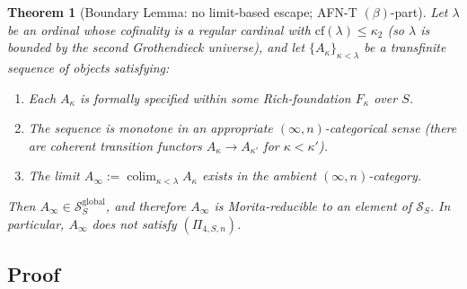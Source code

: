 \documentclass[11pt]{article}
\theoremstyle{plain}
\newtheorem{theorem}{Theorem}[section]
\theoremstyle{definition}
\newcommand{\cS}{\mathcal{S}}
\DeclareMathOperator{\colim}{colim}
\begin{document}
\begin{theorem}[Boundary Lemma: no limit-based escape; AFN-T $(\beta)$-part]\label{thm:afnt-beta}
Let $\lambda$ be an ordinal whose cofinality is a regular cardinal with $\mathrm{cf}(\lambda) \leq \kappa_2$ (so $\lambda$ is bounded by the second Grothendieck universe), and let $\{A_\kappa\}_{\kappa < \lambda}$ be a transfinite sequence of objects satisfying:
\begin{enumerate}[label=(\roman*)]
\item Each $A_\kappa$ is formally specified within some Rich-foundation $F_\kappa$ over $S$.
\item The sequence is monotone in an appropriate $(\infty, n)$-categorical sense (there are coherent transition functors $A_\kappa \to A_{\kappa'}$ for $\kappa < \kappa'$).
\item The limit $A_\infty := \colim_{\kappa < \lambda} A_\kappa$ exists in the ambient $(\infty, n)$-category.
\end{enumerate}
Then $A_\infty \in \cS_S^{\mathrm{global}}$, and therefore $A_\infty$ is Morita-reducible to an element of $\cS_S$. In particular, $A_\infty$ does not satisfy $(\Pi_{4, S, n})$.
\end{theorem}

\subsection{Proof}
\end{document}
